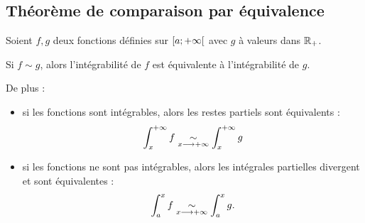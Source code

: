 \subsection{Théorème de comparaison par équivalence}

\begin{theo}
Soient \(f,g\) deux fonctions définies sur \(\left[a;+\infty\right[\) avec \(g\) à valeurs dans \(\mathbb{R}_+\).

Si \(f\sim g\), alors l'intégrabilité de \(f\) est équivalente à l'intégrabilité de \(g\).

De plus :

\begin{itemize}
    \item si les fonctions sont intégrables, alors les restes partiels sont équivalents : \[\int_x^{+\infty}f\underset{x\longrightarrow+\infty}{\sim}\int_x^{+\infty}g\]
    \item si les fonctions ne sont pas intégrables, alors les intégrales partielles divergent et sont équivalentes : \[\int_a^xf\underset{x\longrightarrow+\infty}{\sim}\int_a^xg.\]
\end{itemize}
\end{theo}
